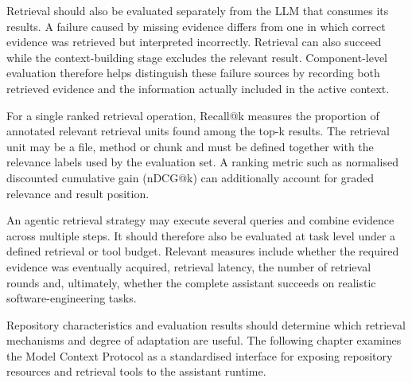 Retrieval should also be evaluated separately from the LLM that consumes its results. A failure caused by missing evidence differs from one in which correct evidence was retrieved but interpreted incorrectly. Retrieval can also succeed while the context-building stage excludes the relevant result. Component-level evaluation therefore helps distinguish these failure sources by recording both retrieved evidence and the information actually included in the active context.

For a single ranked retrieval operation, Recall@k measures the proportion of annotated relevant retrieval units found among the top-k results. The retrieval unit may be a file, method or chunk and must be defined together with the relevance labels used by the evaluation set. A ranking metric such as normalised discounted cumulative gain (nDCG@k) can additionally account for graded relevance and result position.

An agentic retrieval strategy may execute several queries and combine evidence across multiple steps. It should therefore also be evaluated at task level under a defined retrieval or tool budget. Relevant measures include whether the required evidence was eventually acquired, retrieval latency, the number of retrieval rounds and, ultimately, whether the complete assistant succeeds on realistic software-engineering tasks.

Repository characteristics and evaluation results should determine which retrieval mechanisms and degree of adaptation are useful. The following chapter examines the Model Context Protocol as a standardised interface for exposing repository resources and retrieval tools to the assistant runtime.
